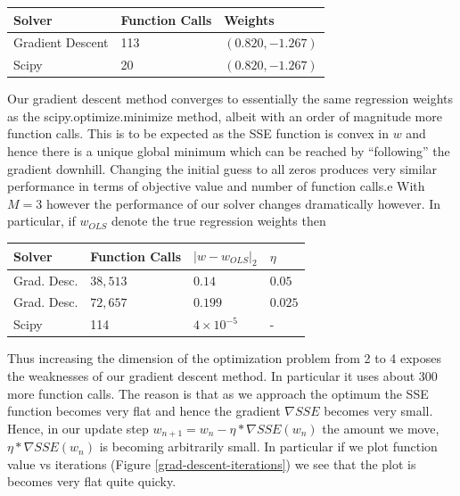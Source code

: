 \documentclass{article}
\begin{document}
\begin{tabular}{|l|l|l|}
\hline
Solver & Function Calls & Weights \\ \hline
Gradient Descent & 113 & $(0.820, -1.267)$ \\ \hline
Scipy & 20 & $(0.820, -1.267)$ \\ \hline
\end{tabular}
%

Our gradient descent method converges to essentially the same regression weights as the scipy.optimize.minimize method, albeit with an order of magnitude more function calls. This is to be expected as the SSE function is convex in $w$ and hence there is a unique global minimum which can be reached by ``following'' the gradient downhill. Changing the initial guess to all zeros produces very similar performance in terms of objective value and number of function calls.e With $M=3$ however the performance of our solver changes dramatically however. In particular, if $w_{OLS}$ denote the true regression weights then

\begin{tabular}{|l|l|l|l|}
\hline
Solver & Function Calls & $|w - w_{OLS}|_2$ & $\eta$ \\ \hline
Grad. Desc. & $38,513$ & $0.14$ & $0.05$ \\ \hline
Grad. Desc. & $72, 657$ & $0.199$ & $0.025$ \\ \hline
Scipy & 114 & $4\times 10^{-5}$ & - \\ \hline
\end{tabular}
%
%

Thus increasing the dimension of the optimization problem from 2 to 4 exposes the weaknesses of our gradient descent method. In particular it uses about 300 more function calls. The reason is that as we approach the optimum the SSE function becomes very flat and hence the gradient $\nabla SSE$ becomes very small. Hence, in our update step $w_{n+1} = w_n - \eta*\nabla SSE(w_n)$ the amount we move, $\eta*\nabla SSE(w_n)$ is becoming arbitrarily small. In particular if we plot function value vs iterations (Figure \ref{grad-descent-iterations}) we see that the plot is becomes very flat quite quicky. 
\end{document}
